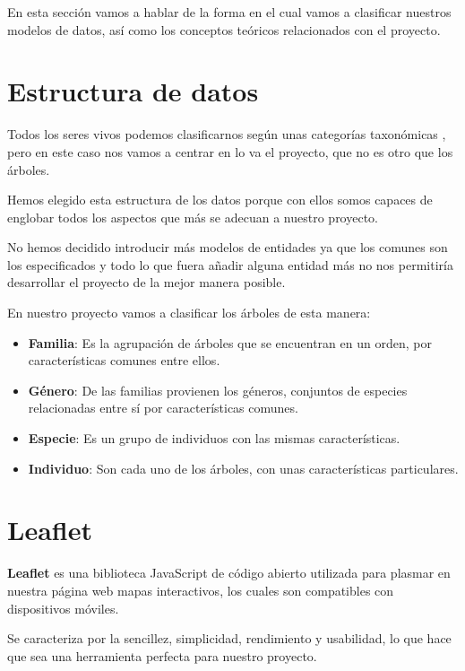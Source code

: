 
En esta sección vamos a hablar de la forma en el cual vamos a clasificar nuestros modelos de datos, así como los conceptos teóricos relacionados con el proyecto.

\section{Estructura de datos}

Todos los seres vivos podemos clasificarnos según unas categorías taxonómicas \cite{CategoriaTaxonomica}, pero en este caso nos vamos a centrar en lo va el proyecto, que no es otro que los árboles.

Hemos elegido esta estructura de los datos porque con ellos somos capaces de englobar todos los aspectos que más se adecuan a nuestro proyecto.

No hemos decidido introducir más modelos de entidades ya que los comunes son los especificados y todo lo que fuera añadir alguna entidad más no nos permitiría desarrollar el proyecto de la mejor manera posible.

En nuestro proyecto vamos a clasificar los árboles de esta manera:
\begin{itemize}
	\item \textbf{Familia}: Es la agrupación de árboles que se encuentran en un orden, por características comunes entre ellos.
	\item \textbf{Género}: De las familias provienen los géneros, conjuntos de especies relacionadas entre sí por características comunes.
	\item \textbf{Especie}: Es un grupo de individuos con las mismas características.
	\item \textbf{Individuo}: Son cada uno de los árboles, con unas características particulares.
\end{itemize}

\section{Leaflet}

\textbf{Leaflet} \cite{leaflet} es una biblioteca JavaScript de código abierto utilizada para plasmar en nuestra página web mapas interactivos, los cuales son compatibles con dispositivos móviles.

Se caracteriza por la sencillez, simplicidad, rendimiento y usabilidad, lo que hace que sea una herramienta perfecta para nuestro proyecto.

